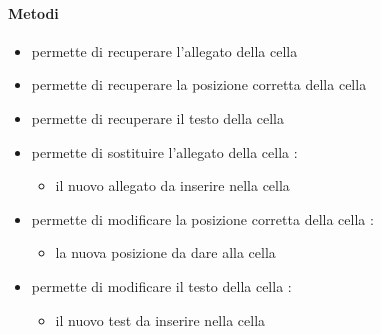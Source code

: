 \paragraph{Metodi}
\begin{itemize}
\item {}
\newline
permette di recuperare l'allegato della cella
\newline
\item {}
\newline
permette di recuperare la posizione corretta della cella
\newline
\item {}
\newline
permette di recuperare il testo della cella
\newline
\item {}
\newline
permette di sostituire l'allegato della cella
\newline
{} :
\begin{itemize}
\item {}
\newline
il nuovo allegato da inserire nella cella
\end{itemize}
\item {}
\newline
permette di modificare la posizione corretta della cella
\newline
{} :
\begin{itemize}
\item {}
\newline
la nuova posizione da dare alla cella
\end{itemize}
\item {}
\newline
permette di modificare il testo della cella
\newline
{} :
\begin{itemize}
\item {}
\newline
il nuovo test da inserire nella cella
\end{itemize}
\end{itemize}
